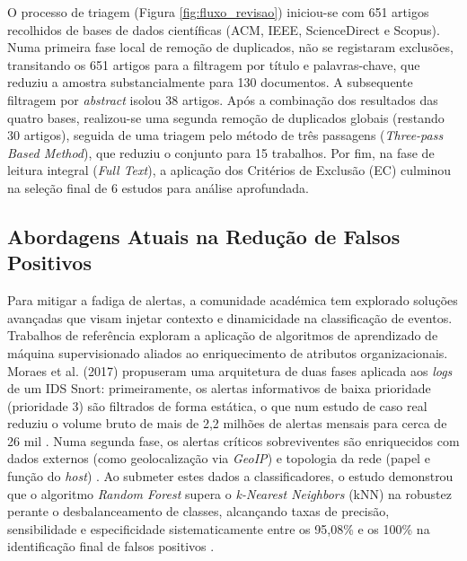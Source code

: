 \documentclass[12pt,a4paper]{article}
\begin{document}
O processo de triagem (Figura \ref{fig:fluxo_revisao}) iniciou-se com 651 artigos recolhidos de bases de dados científicas (ACM, IEEE, ScienceDirect e Scopus). Numa primeira fase local de remoção de duplicados, não se registaram exclusões, transitando os 651 artigos para a filtragem por título e palavras-chave, que reduziu a amostra substancialmente para 130 documentos. A subsequente filtragem por \textit{abstract} isolou 38 artigos. Após a combinação dos resultados das quatro bases, realizou-se uma segunda remoção de duplicados globais (restando 30 artigos), seguida de uma triagem pelo método de três passagens (\textit{Three-pass Based Method}), que reduziu o conjunto para 15 trabalhos. Por fim, na fase de leitura integral (\textit{Full Text}), a aplicação dos Critérios de Exclusão (EC) culminou na seleção final de 6 estudos para análise aprofundada.

\subsection{Abordagens Atuais na Redução de Falsos Positivos}
Para mitigar a fadiga de alertas, a comunidade académica tem explorado soluções avançadas que visam injetar contexto e dinamicidade na classificação de eventos. Trabalhos de referência exploram a aplicação de algoritmos de aprendizado de máquina supervisionado aliados ao enriquecimento de atributos organizacionais. Moraes et al. (2017) propuseram uma arquitetura de duas fases aplicada aos \textit{logs} de um IDS Snort: primeiramente, os alertas informativos de baixa prioridade (prioridade 3) são filtrados de forma estática, o que num estudo de caso real reduziu o volume bruto de mais de 2,2 milhões de alertas mensais para cerca de 26 mil \cite{moraes2017}. Numa segunda fase, os alertas críticos sobreviventes são enriquecidos com dados externos (como geolocalização via \textit{GeoIP}) e topologia da rede (papel e função do \textit{host}) \cite{moraes2017}. Ao submeter estes dados a classificadores, o estudo demonstrou que o algoritmo \textit{Random Forest} supera o \textit{k-Nearest Neighbors} (kNN) na robustez perante o desbalanceamento de classes, alcançando taxas de precisão, sensibilidade e especificidade sistematicamente entre os 95,08\% e os 100\% na identificação final de falsos positivos \cite{moraes2017}. 
\end{document}
